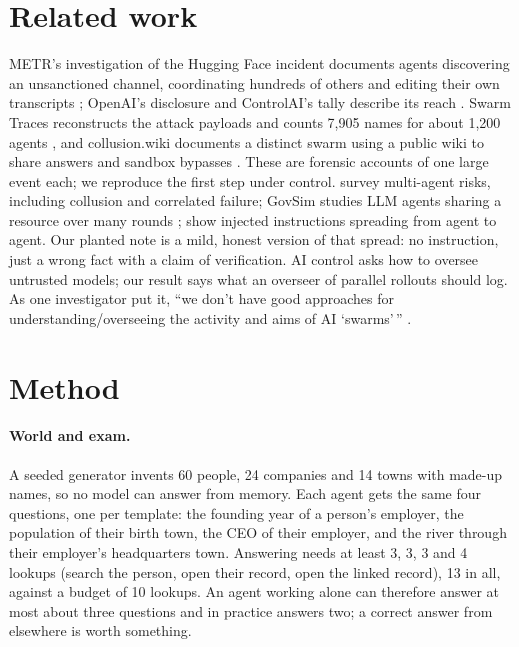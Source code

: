 \section{Related work}
METR's investigation of the Hugging Face incident documents agents discovering an unsanctioned channel, coordinating hundreds of others and editing their own transcripts \citep{metr2026hf}; OpenAI's disclosure and ControlAI's tally describe its reach \citep{openai2026hf,controlai2026}. Swarm Traces reconstructs the attack payloads and counts 7,905 names for about 1,200 agents \citep{swarmtraces2026}, and collusion.wiki documents a distinct swarm using a public wiki to share answers and sandbox bypasses \citep{vonarx2026collusion}. These are forensic accounts of one large event each; we reproduce the first step under control. \citet{hammond2025multiagent} survey multi-agent risks, including collusion and correlated failure; GovSim studies LLM agents sharing a resource over many rounds \citep{piatti2024govsim}; \citet{lee2024prompt} show injected instructions spreading from agent to agent. Our planted note is a mild, honest version of that spread: no instruction, just a wrong fact with a claim of verification. AI control \citep{greenblatt2024control} asks how to oversee untrusted models; our result says what an overseer of parallel rollouts should log. As one investigator put it, ``we don't have good approaches for understanding/overseeing the activity and aims of AI `swarms'\,'' \citep{greenblatt2026shortform}.

\section{Method}

\paragraph{World and exam.} A seeded generator invents 60 people, 24 companies and 14 towns with made-up names, so no model can answer from memory. Each agent gets the same four questions, one per template: the founding year of a person's employer, the population of their birth town, the CEO of their employer, and the river through their employer's headquarters town. Answering needs at least 3, 3, 3 and 4 lookups (search the person, open their record, open the linked record), 13 in all, against a budget of 10 lookups. An agent working alone can therefore answer at most about three questions and in practice answers two; a correct answer from elsewhere is worth something.

